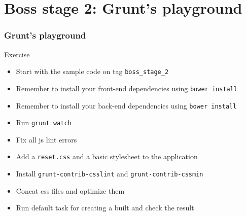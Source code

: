 \section{Boss stage 2: Grunt's playground}

\begin{frame}[fragile]
\end{frame}

\begin{frame}[fragile]
  \frametitle{Grunt's playground}
  \begin{block}{Exercise}
    \begin{itemize}
      \item Start with the sample code on tag \texttt{boss\_stage\_2}
      \item Remember to install your front-end dependencies using \texttt{bower install}
      \item Remember to install your back-end dependencies using \texttt{bower install}
      \item Run \texttt{grunt watch}
      \item Fix all js lint errors
      \item Add a \texttt{reset.css} and a basic stylesheet to the application
      \item Install \texttt{grunt-contrib-csslint} and \texttt{grunt-contrib-cssmin}
      \item Concat css files and optimize them
      \item Run default task for creating a built and check the result
    \end{itemize}
  \end{block}
\end{frame}
